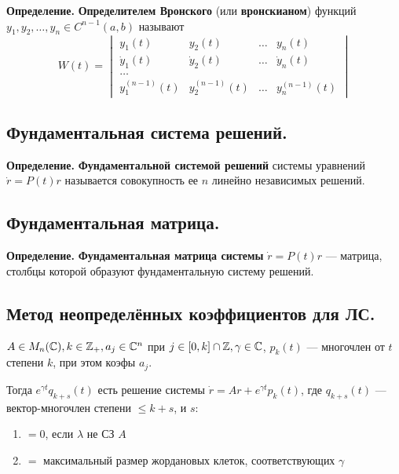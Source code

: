 \noindent \textbf{Определение.} \textbf{Определителем Вронского} (или \textbf{вронскианом}) функций $y_1, y_2, \ldots, y_n \in C^{n-1}(a,b)$ называют
\begin{equation*}
    W(t) = \begin{vmatrix}
        y_1(t)         & y_2(t)         & \ldots & y_n(t)         \\
        \dot{y}_1(t)   & \dot{y}_2(t)   & \ldots & \dot{y}_n(t)   \\
        \ldots                                                    \\
        y_1^{(n-1)}(t) & y_2^{(n-1)}(t) & \ldots & y_n^{(n-1)}(t)
    \end{vmatrix}
\end{equation*}

\subsection*{Фундаментальная система решений.}

\noindent \textbf{Определение.} \textbf{Фундаментальной системой решений} системы уравнений $\dot{r} = P(t)r$ называется совокупность ее $n$ линейно независимых решений.

\subsection*{Фундаментальная матрица.}

\noindent \textbf{Определение.} \textbf{Фундаментальная матрица системы} $\dot{r} = P(t)r$ --- матрица, столбцы которой образуют фундаментальную систему решений.

\subsection*{Метод неопределённых коэффициентов для ЛС.}

\(A\in M_n(\mathbb{C}), k\in \mathbb{Z}_{+}, a_j\in\mathbb{C}^n\) при \(j\in[0,k]\cap \mathbb{Z}, \gamma\in\mathbb{C}\), \(p_k(t)\) --- многочлен от \(t\) степени \(k\), при этом коэфы \(a_j\).

Тогда \(e^{\gamma t} q_{k + s}(t)\) есть решение системы \(\dot{r} = Ar + e^{\gamma t} p_k(t)\), где \(q_{k + s}(t)\) --- вектор-многочлен степени \( \leq k + s\), и \(s\):
\begin{enumerate}
    \item \( = 0\), если \(\lambda\) не СЗ \(A\)
    \item \( =\) максимальный размер жордановых клеток, соответствующих \(\gamma\)
\end{enumerate}


